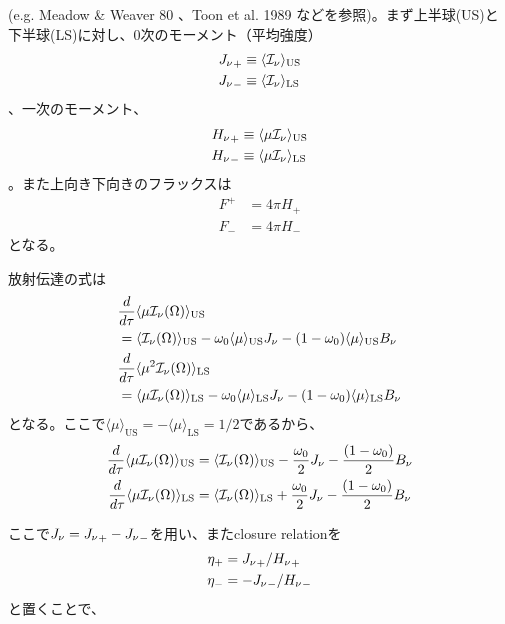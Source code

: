 (e.g. Meadow \& Weaver 80 \cite{1980JAtS...37..630M}、Toon et al. 1989 \cite{1989JGR....9416287T}などを参照)。まず上半球(US)と下半球(LS)に対し、0次のモーメント（平均強度）
\begin{align}
{J_\nu}_+ &\equiv \langle{\mathcal{I}_\nu} \rangle_\mathrm{US} \\
{J_\nu}_- &\equiv \langle{\mathcal{I}_\nu} \rangle_\mathrm{LS} 
\end{align}
、一次のモーメント、
\begin{align}
{H_\nu}_+ &\equiv \langle\mu {\mathcal{I}_\nu} \rangle_\mathrm{US} \\
{H_\nu}_- &\equiv \langle\mu {\mathcal{I}_\nu} \rangle_\mathrm{LS} 
\end{align}
。また上向き下向きのフラックスは
\begin{align}
F^+ &= 4 \pi H_+ \\
F_- &= 4 \pi H_-
\end{align}
となる。

放射伝達の式は
\begin{align}
\label{eq:ratvvx}
 &\frac{d  }{d \tau} \langle\mu  {\mathcal{I}_\nu} (\Omega) \rangle_\mathrm{US} \nonumber \\
 &=  \langle {\mathcal{I}_\nu}(\Omega) \rangle_\mathrm{US}  - \omega_0 \langle \mu  \rangle_\mathrm{US} J_\nu - (1-\omega_0) \langle\mu \rangle_\mathrm{US} B_\nu \\
 \label{eq:ratvv2x}
 &\frac{d  }{d \tau} \langle\mu^2  {\mathcal{I}_\nu} (\Omega) \rangle_\mathrm{LS} \nonumber \\
 &=  \langle\mu {\mathcal{I}_\nu}(\Omega) \rangle_\mathrm{LS} - \omega_0 \langle \mu \rangle_\mathrm{LS} J_\nu  - (1-\omega_0)\langle\mu \rangle_\mathrm{LS} B_\nu  
 \end{align}
となる。ここで$\langle \mu \rangle_\mathrm{US}=-\langle \mu \rangle_\mathrm{LS}=1/2$であるから、
\begin{align}
\label{eq:ratvv}
 \frac{d  }{d \tau} \langle\mu  {\mathcal{I}_\nu} (\Omega) \rangle_\mathrm{US}  &=  \langle{\mathcal{I}_\nu}(\Omega) \rangle_\mathrm{US} - \frac{\omega_0}{2} J_\nu  - \frac{(1-\omega_0)}{2} B_\nu  \\
 \label{eq:ratvv2}
 \frac{d  }{d \tau} \langle\mu  {\mathcal{I}_\nu} (\Omega) \rangle_\mathrm{LS}  &=  \langle {\mathcal{I}_\nu}(\Omega) \rangle_\mathrm{LS}  + \frac{\omega_0}{2} J_\nu - \frac{(1-\omega_0)}{2} B_\nu  
 \end{align}

ここで${J_\nu} = {J_\nu}_+ - {J_\nu}_-$を用い、またclosure relationを
\begin{align}
\eta_+ &= {J_\nu}_+/{H_\nu}_+ \\
\eta_- &= - {J_\nu}_-/{H_\nu}_- 
\end{align}
と置くことで、

